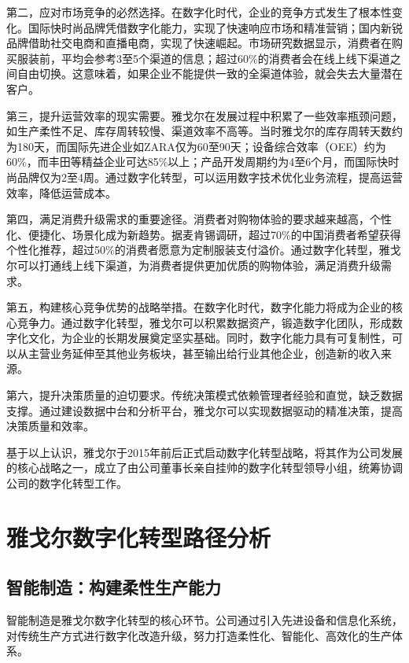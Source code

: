 \documentclass[12pt,a4paper]{article}
\begin{document}
第二，应对市场竞争的必然选择。在数字化时代，企业的竞争方式发生了根本性变化。国际快时尚品牌凭借数字化能力，实现了快速响应市场和精准营销；国内新锐品牌借助社交电商和直播电商，实现了快速崛起。市场研究数据显示，消费者在购买服装前，平均会参考3至5个渠道的信息；超过60\%的消费者会在线上线下渠道之间自由切换。这意味着，如果企业不能提供一致的全渠道体验，就会失去大量潜在客户。

第三，提升运营效率的现实需要。雅戈尔在发展过程中积累了一些效率瓶颈问题，如生产柔性不足、库存周转较慢、渠道效率不高等。当时雅戈尔的库存周转天数约为180天，而国际先进企业如ZARA仅为60至90天；设备综合效率（OEE）约为60\%，而丰田等精益企业可达85\%以上；产品开发周期约为4至6个月，而国际快时尚品牌仅为2至4周。通过数字化转型，可以运用数字技术优化业务流程，提高运营效率，降低运营成本。

第四，满足消费升级需求的重要途径。消费者对购物体验的要求越来越高，个性化、便捷化、场景化成为新趋势。据麦肯锡调研，超过70\%的中国消费者希望获得个性化推荐，超过50\%的消费者愿意为定制服装支付溢价。通过数字化转型，雅戈尔可以打通线上线下渠道，为消费者提供更加优质的购物体验，满足消费升级需求。

第五，构建核心竞争优势的战略举措。在数字化时代，数字化能力将成为企业的核心竞争力。通过数字化转型，雅戈尔可以积累数据资产，锻造数字化团队，形成数字化文化，为企业的长期发展奠定坚实基础。同时，数字化能力具有可复制性，可以从主营业务延伸至其他业务板块，甚至输出给行业其他企业，创造新的收入来源。

第六，提升决策质量的迫切要求。传统决策模式依赖管理者经验和直觉，缺乏数据支撑。通过建设数据中台和分析平台，雅戈尔可以实现数据驱动的精准决策，提高决策质量和效率。

基于以上认识，雅戈尔于2015年前后正式启动数字化转型战略，将其作为公司发展的核心战略之一，成立了由公司董事长亲自挂帅的数字化转型领导小组，统筹协调公司的数字化转型工作。

\newpage

\section{雅戈尔数字化转型路径分析}

\subsection{智能制造：构建柔性生产能力}

智能制造是雅戈尔数字化转型的核心环节。公司通过引入先进设备和信息化系统，对传统生产方式进行数字化改造升级，努力打造柔性化、智能化、高效化的生产体系。
\end{document}
